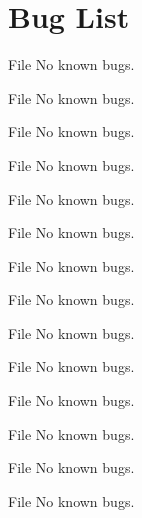 \chapter{Bug List}
\hypertarget{bug}{}\label{bug}

\begin{DoxyRefList}
\item[File \doxylink{all__system_8h}{all\+\_\+system.h} ]\label{bug__bug000059}%
%
No known bugs.  
\item[File \doxylink{base__debug_8h}{base\+\_\+debug.h} ]\label{bug__bug000060}%
%
No known bugs.  
\item[File \doxylink{base__lib_8h}{base\+\_\+lib.h} ]\label{bug__bug000061}%
%
No known bugs.  
\item[File \doxylink{darray_8c}{darray.c} ]\label{bug__bug000001}%
%
No known bugs.  
\item[File \doxylink{darray_8h}{darray.h} ]\label{bug__bug000062}%
%
No known bugs.  
\item[File \doxylink{debug__msg_8c}{debug\+\_\+msg.c} ]\label{bug__bug000002}%
%
No known bugs.  
\item[File \doxylink{debug__msg_8h}{debug\+\_\+msg.h} ]\label{bug__bug000063}%
%
No known bugs.  
\item[File \doxylink{debug__tags_8h}{debug\+\_\+tags.h} ]\label{bug__bug000064}%
%
No known bugs.  
\item[File \doxylink{dtable_8c}{dtable.c} ]\label{bug__bug000003}%
%
No known bugs.  
\item[File \doxylink{dtable_8h}{dtable.h} ]\label{bug__bug000065}%
%
No known bugs.  
\item[File \doxylink{expand_8h}{expand.h} ]\label{bug__bug000090}%
%
No known bugs.  
\item[File \doxylink{expand__lib_8h}{expand\+\_\+lib.h} ]\label{bug__bug000091}%
%
No known bugs.  
\item[File \doxylink{filesystem_8h}{filesystem.h} ]\label{bug__bug000066}%
%
No known bugs.  
\item[File \doxylink{math__misc_8c}{math\+\_\+misc.c} ]\label{bug__bug000004}%
%
No known bugs.  

\end{DoxyRefList}
